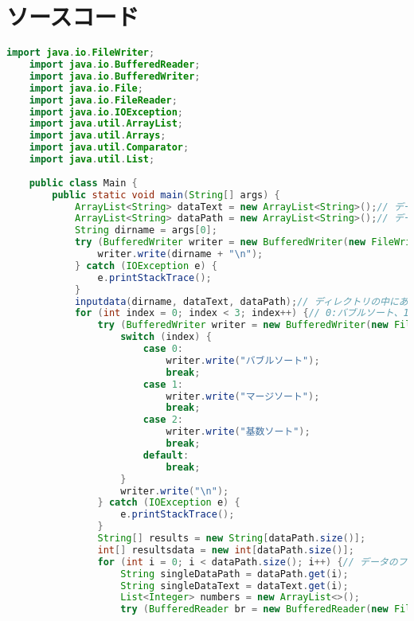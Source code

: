 \documentclass{jsarticle}
\begin{document}
\section{ソースコード}
\begin{lstlisting}[label=code:in, language=java]
    import java.io.FileWriter;
    import java.io.BufferedReader;
    import java.io.BufferedWriter;
    import java.io.File;
    import java.io.FileReader;
    import java.io.IOException;
    import java.util.ArrayList;
    import java.util.Arrays;
    import java.util.Comparator;
    import java.util.List;
    
    public class Main {
        public static void main(String[] args) {
            ArrayList<String> dataText = new ArrayList<String>();// データのファイルの名前を格納
            ArrayList<String> dataPath = new ArrayList<String>();// データのファイルのパスを格納
            String dirname = args[0];
            try (BufferedWriter writer = new BufferedWriter(new FileWriter("result.txt", true))) {
                writer.write(dirname + "\n");
            } catch (IOException e) {
                e.printStackTrace();
            }
            inputdata(dirname, dataText, dataPath);// ディレクトリの中にあるデータのファイルをdataTextに格納
            for (int index = 0; index < 3; index++) {// 0:バブルソート、1:マージソート、2:基数ソート
                try (BufferedWriter writer = new BufferedWriter(new FileWriter("result.txt", true))) {
                    switch (index) {
                        case 0:
                            writer.write("バブルソート");
                            break;
                        case 1:
                            writer.write("マージソート");
                            break;
                        case 2:
                            writer.write("基数ソート");
                            break;
                        default:
                            break;
                    }
                    writer.write("\n");
                } catch (IOException e) {
                    e.printStackTrace();
                }
                String[] results = new String[dataPath.size()];
                int[] resultsdata = new int[dataPath.size()];
                for (int i = 0; i < dataPath.size(); i++) {// データのファイル数だけ繰り返す
                    String singleDataPath = dataPath.get(i);
                    String singleDataText = dataText.get(i);
                    List<Integer> numbers = new ArrayList<>();
                    try (BufferedReader br = new BufferedReader(new FileReader(singleDataPath))) {// ファイルを読み込む

\end{lstlisting}
\end{document}
